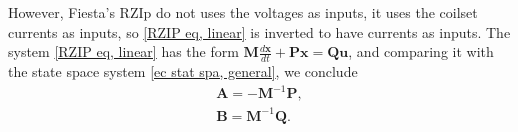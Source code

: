 \documentclass[a4paper,12pt,oneside]{book}
\begin{document}
However, Fiesta's RZIp do not uses the voltages as inputs, it uses the coilset currents as inputs, so \eqref{RZIP eq, linear} is inverted to have currents as inputs.
%
%
%
%
%
%
The system \eqref{RZIP eq, linear} has the form $\boldsymbol{M} \frac{d\boldsymbol{x}}{dt}+\boldsymbol{P x}=\boldsymbol{Q u}$, and comparing it with the state space system \eqref{ec stat spa, general}, we conclude
%
\begin{equation}
\left.
\begin{array}{c}
\boldsymbol{A}=-\boldsymbol{M}^{-1}\boldsymbol{P}, \\
\boldsymbol{B}=\boldsymbol{M}^{-1}\boldsymbol{Q}.
\end{array}
\right.
\end{equation}
\end{document}
